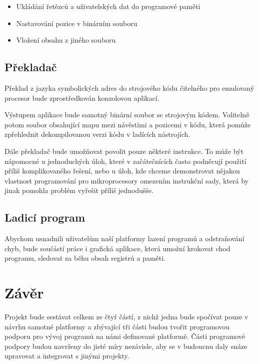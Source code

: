 \begin{itemize}
	\item Ukládání řetězců a uživatelských dat do programové paměti
	\item Nastavování pozice v binárním souboru
	\item Vložení obsahu z jiného souboru
\end{itemize}

\subsection{Překladač}

Překlad z jazyka symbolických adres do strojového kódu čitelného pro emulovaný procesor bude zprostředkován konzolovou aplikací.

Výstupem aplikace bude samotný binární soubor se strojovým kódem. Volitelně potom soubor obsahující mapu mezi návěstími a pozicemi v kódu, která pomůže zpřehlednit dekompilovanou verzi kódu v ladících nástrojích.

Dále překladač bude umožňovat povolit pouze některé instrukce. To může být nápomocné u jednoduchých úloh, které v začátečnících často podněcují použití příliš komplikovaného řešení, nebo u úloh, kde chceme demonstrovat nějakou vlastnost programování pro mikroprocesory omezením instrukční sady, která by jinak pomohla problém vyřešit příliš jednodušše.

\subsection{Ladicí program}

Abychom usnadnili uživatelům naší platformy lazení programů a odstraňování chyb, bude součástí práce i grafická aplikace, která umožní krokovat chod programu, sledovat za běhu obsah registrů a paměti.

\section{Závěr}

Projekt bude sestávat celkem ze čtyř částí, z nichž jedna bude spočívat pouze v návrhu samotné platformy a zbývající tři části budou tvořit programovou podporu pro vývoj programů na námi definované platformě. Části programové podpory budou navrženy do jisté míry nezávisle, aby se v budoucnu daly snáze upravovat a integrovat s jinými projekty.